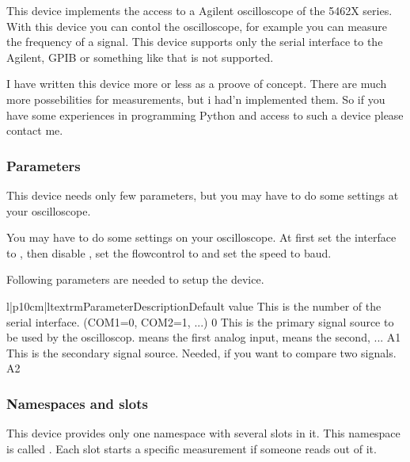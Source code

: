 This device implements the access to a Agilent oscilloscope of the 5462X 
series. With this device you can contol the oscilloscope, for example you can
measure the frequency of a signal. This device supports only the serial
interface to the Agilent, GPIB or something like that is not supported.

I have written this device more or less as a proove of concept. There are
much more possebilities for measurements, but i had'n implemented them.
So if you have some experiences in programming Python and access to such
a device please contact me.

\subsubsection{Parameters}
This device needs only few parameters, but you may have to do some settings 
at your oscilloscope. 

\begin{notice} You may have to do some settings on your oscilloscope.
At first set the interface to , then disable ,
set the flowcontrol to  and set the speed to  baud.
\end{notice}

Following parameters are needed to setup the device.
\begin{tableiii}{l|p{10cm}|l}{textrm}{Parameter}{Description}{Default value}
        {This is the number of the serial interface. (COM1=0, COM2=1, ...)}
        {0}
        {This is the primary signal source to be used by the oscilloscop.
         means the first analog input,  means the second, 
        ...}
        {A1}
        {This is the secondary signal source. Needed, if you want to compare two signals.}
        {A2}
\end{tableiii}

\subsubsection{Namespaces and slots}
This device provides only one namespace with several slots in it. This namespace is called
. Each slot starts a specific measurement if someone reads out of it.


